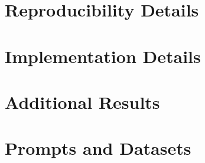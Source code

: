 \section{Reproducibility Details}
\label{app:repro}


\section{Implementation Details}
\label{app:impl}


\section{Additional Results}
\label{app:additional}


\section{Prompts and Datasets}
\label{app:prompts}

